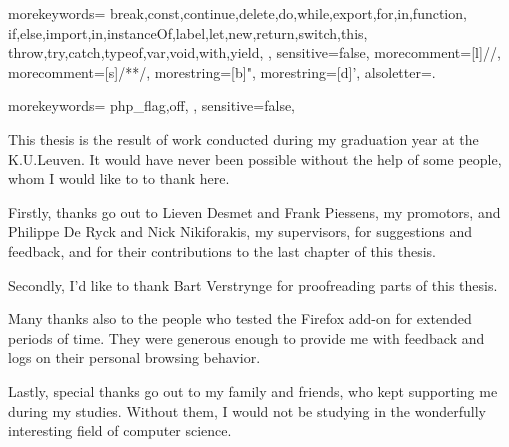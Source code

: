 \documentclass[master=cws,english]{kulemt}
\begin{document}
 {
    morekeywords={
        break,const,continue,delete,do,while,export,for,in,function,
        if,else,import,in,instanceOf,label,let,new,return,switch,this,
        throw,try,catch,typeof,var,void,with,yield,
        },
    sensitive=false,
    morecomment=[l]{//},
    morecomment=[s]{/*}{*/},
    morestring=[b]",
    morestring=[d]',
    alsoletter={.}
}

 {
    morekeywords={
        php_flag,off,
        },
    sensitive=false,
}


\begin{preface}
This thesis is the result of work conducted during my graduation year at the K.U.Leuven. It would have never been possible without the help of some people, whom I would like to to thank here.

Firstly, thanks go out to Lieven Desmet and Frank Piessens, my promotors, and Philippe De Ryck and Nick Nikiforakis, my supervisors, for suggestions and feedback, and for their contributions to the last chapter of this thesis.

Secondly, I'd like to thank Bart Verstrynge for proofreading parts of this thesis.

Many thanks also to the people who tested the Firefox add-on for extended periods of time. They were generous enough to provide me with feedback and logs on their personal browsing behavior.

Lastly, special thanks go out to my family and friends, who kept supporting me during my studies. Without them, I would not be studying in the wonderfully interesting field of computer science.
\end{preface}

\tableofcontents*
\end{document}
